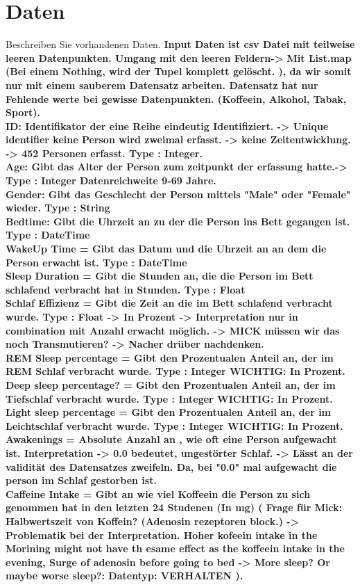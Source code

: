 \documentclass[usegeometry=true]{scrartcl}
\begin{document}
\section{Daten}
Beschreiben Sie vorhandenen Daten. 
\textbf {Input Daten ist csv Datei mit teilweise leeren Datenpunkten. Umgang mit den leeren Feldern-> Mit List.map (Bei einem Nothing, wird der Tupel komplett gelöscht. ), da wir somit nur mit einem sauberem Datensatz arbeiten. Datensatz hat nur Fehlende werte bei gewisse Datenpunkten. (Koffeein, Alkohol, Tabak, Sport).
\\ ID\@ : Identifikator der eine Reihe eindeutig Identifiziert. -> Unique identifier keine Person wird zweimal erfasst. -> keine Zeitentwicklung. -> 452 Personen erfasst. Type : Integer.
\\ Age: Gibt das Alter der Person zum zeitpunkt der erfassung hatte.-> Type : Integer   Datenreichweite 9-69 Jahre.
\\ Gender: Gibt das Geschlecht der Person mittels "Male" oder "Female" wieder. Type : String
\\ Bedtime: Gibt die Uhrzeit an zu der die Person ins Bett gegangen ist. Type : DateTime
\\ WakeUp Time = Gibt das Datum und die Uhrzeit an an dem die Person erwacht ist.  Type : DateTime
\\ Sleep Duration = Gibt die Stunden an, die die Person im Bett schlafend verbracht hat in Stunden. Type : Float 
\\  Schlaf Effizienz = Gibt die Zeit an die im Bett schlafend verbracht wurde. Type : Float -> In Prozent -> Interpretation nur in combination mit Anzahl erwacht möglich. -> MICK müssen wir das noch Transmutieren? -> Nacher drüber nachdenken.
\\ REM Sleep percentage = Gibt den Prozentualen Anteil an, der im REM Schlaf verbracht wurde. Type : Integer WICHTIG: In Prozent. 
\\ Deep sleep percentage? = Gibt den Prozentualen Anteil an, der im Tiefschlaf verbracht wurde. Type : Integer WICHTIG: In Prozent.
\\ Light sleep percentage = Gibt den Prozentualen Anteil an, der im Leichtschlaf verbracht wurde. Type : Integer WICHTIG: In Prozent.
\\ Awakenings = Absolute Anzahl an , wie oft eine Person aufgewacht ist. Interpretation -> 0.0 bedeutet, ungestörter Schlaf. -> Lässt an der validität des Datensatzes zweifeln. Da, bei "0.0" mal aufgewacht die person im Schlaf gestorben ist.
\\ Caffeine Intake = Gibt an wie viel Koffeein die Person zu sich genommen hat in den letzten 24 Studenen (In mg) ( Frage für Mick: Halbwertszeit von Koffein? (Adenosin rezeptoren block.) -> Problematik bei der Interpretation. Hoher kofeein intake in the Morining might not have th esame effect as the koffeein intake in the evening, Surge of adenosin before going to bed -> More sleep? Or maybe worse sleep?: Datentyp: VERHALTEN ). 
}
\end{document}
